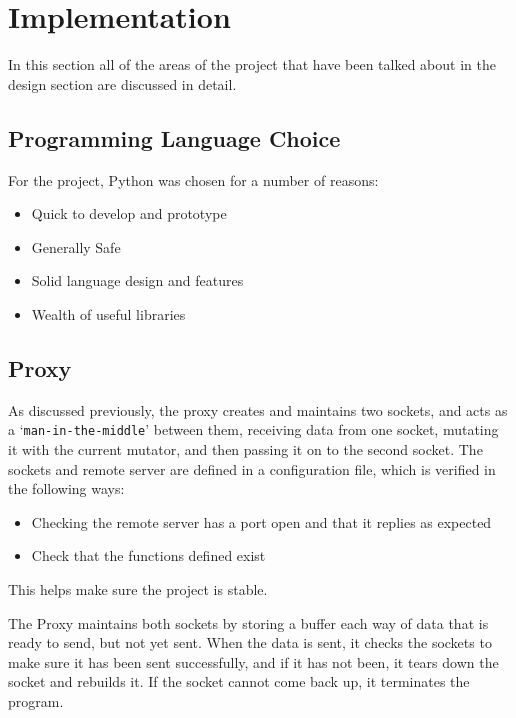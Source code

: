 
\section{Implementation}
In this section all of the areas of the project that have been talked about in the design section are discussed in detail.

\subsection{Programming Language Choice}
For the project, Python was chosen for a number of reasons:
\begin{itemize}
    \item Quick to develop and prototype
    \item Generally Safe
    \item Solid language design and features
    \item Wealth of useful libraries
\end{itemize}

\subsection{Proxy}
As discussed previously, the proxy creates and maintains two sockets, and acts as a `\texttt{man-in-the-middle}' between them, receiving data from one socket, mutating it with the current mutator, and then passing it on to the second socket. The sockets and remote server are defined in a configuration file, which is verified in the following ways:
\begin{itemize}
    \item Checking the remote server has a port open and that it replies as expected
    \item Check that the functions defined exist
\end{itemize}
This helps make sure the project is stable.\par

The Proxy maintains both sockets by storing a buffer each way of data that is ready to send, but not yet sent. When the data is sent, it checks the sockets to make sure it has been sent successfully, and if it has not been, it tears down the socket and rebuilds it. If the socket cannot come back up, it terminates the program.
